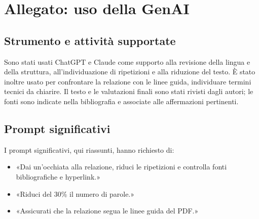 \section*{Allegato: uso della GenAI}

\subsection*{Strumento e attività supportate}
Sono stati usati ChatGPT e Claude come supporto alla revisione della lingua e della
struttura, all'individuazione di ripetizioni e alla riduzione del testo. È
stato inoltre usato per confrontare la relazione con le linee guida, individuare
termini tecnici da chiarire. Il testo e le valutazioni finali sono stati rivisti
dagli autori; le fonti sono indicate nella bibliografia e associate alle
affermazioni pertinenti.

\subsection*{Prompt significativi}
I prompt significativi, qui riassunti, hanno richiesto di:
\begin{itemize}
    \item «Dai un'occhiata alla relazione, riduci le ripetizioni e controlla
    fonti bibliografiche e hyperlink.»
    \item «Riduci del 30\% il numero di parole.»
    \item «Assicurati che la relazione segua le linee guida del PDF.»
\end{itemize}
